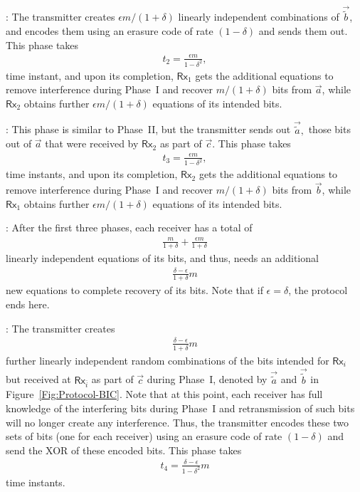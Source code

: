 \documentclass[journal,12pt,draftcls,onecolumn]{IEEEtran}
\newcommand{\msf}{\mathsf}
\newcommand{\lp}{\left(}
\newcommand{\rp}{\right)}
\begin{document}
: The transmitter creates $\epsilon m/(1+\delta)$ linearly independent combinations of $\vec{\tilde{b}}$, and encodes them using an erasure code of rate $(1-\delta)$ and sends them out. This phase takes
\begin{align}
t_2 = \frac{\epsilon m}{1-\delta^2},
\end{align}
time instant, and upon its completion, $\msf{Rx}_1$ gets the additional equations to remove interference during Phase~I and recover $m/(1+\delta)$ bits from $\vec{a}$, while $\msf{Rx}_2$ obtains further $\epsilon m/(1+\delta)$ equations of its intended bits.

: This phase is similar to Phase~II, but the transmitter sends out $\vec{\tilde{a}},$ those bits out of $\vec{a}$ that were received by $\msf{Rx}_2$ as part of $\vec{c}$. This phase takes
\begin{align}
t_3 = \frac{\epsilon m}{1-\delta^2},
\end{align}
time instants, and upon its completion, $\msf{Rx}_2$ gets the additional equations to remove interference during Phase~I and recover $m/(1+\delta)$ bits from $\vec{b}$, while $\msf{Rx}_1$ obtains further $\epsilon m/(1+\delta)$ equations of its intended bits.

: After the first three phases, each receiver has a total of
\begin{align}
\frac{m}{1+\delta} + \frac{\epsilon m}{1+\delta}
\end{align}
linearly independent equations of its bits, and thus, needs an additional
\begin{align}
\label{Eq:finalphasefraction}
\frac{\delta- \epsilon}{1+\delta}m
\end{align}
new equations to complete recovery of its bits. Note that if $\epsilon = \delta$, the protocol ends here.

 : The transmitter creates
 \begin{align}
 \frac{\delta- \epsilon}{1+\delta}m
 \end{align}
 further linearly independent random combinations of the bits intended for $\msf{Rx}_i$ but received at $\msf{Rx}_{\bar{i}}$ as part of $\vec{c}$ during Phase~I, denoted by $\vec{\tilde{a}}$ and $\vec{\tilde{b}}$ in Figure~\ref{Fig:Protocol-BIC}. Note that at this point, each receiver has full knowledge of the interfering bits during Phase~I and retransmission of such bits will no longer create any interference. Thus, the transmitter encodes these two sets of bits (one for each receiver) using an erasure code of rate $\lp 1 - \delta \rp$ and send the XOR of these encoded bits. This phase takes
\begin{align}
t_4 = \frac{\delta- \epsilon}{1-\delta^2}m
\end{align}
time instants.
\end{document}
